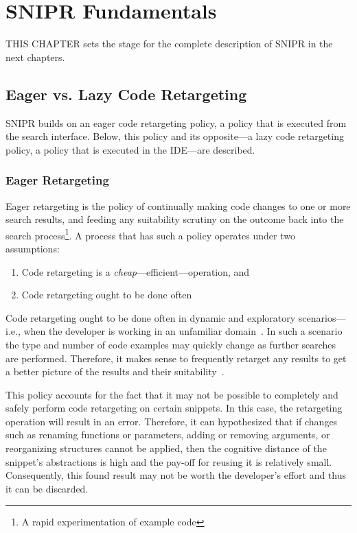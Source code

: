 \chapter{\uppercase{SnipR} Fundamentals}{}
\label{sec:fundamentals}


\lettrine[lraise=0.1, nindent=0em, slope=-.5em]{T} {HIS CHAPTER} sets the stage for the complete description of \uppercase{SnipR} in the next chapters.

\section{Eager vs. Lazy Code Retargeting}
\label{sec:eagervslazy}

\uppercase{SnipR} builds on an eager code retargeting policy, a policy that is executed from the search interface. Below, this policy and its opposite---a lazy code retargeting policy, a policy that is executed in the IDE---are described.

\subsection{Eager Retargeting}

Eager retargeting is the policy of continually making code changes to one or more search results, and feeding any suitability scrutiny on the outcome back into the search process\footnote{A rapid experimentation of example code}. A process that has such a policy operates under two assumptions:

\begin{enumerate}
	\item Code retargeting is a \emph{cheap}---efficient---operation, and
	\item Code retargeting ought to be done often
\end{enumerate}

Code retargeting ought to be done often in dynamic and exploratory scenarios---i.e., when the developer is working in an unfamiliar domain~\cite{Brandt:2009ew}. In such a scenario the type and number of code examples may quickly change as further searches are performed. Therefore, it makes sense to frequently retarget any results to get a better picture of the results and their suitability~\cite{Fowler:1999vp, Brandt:2009ew}. 

This policy accounts for the fact that it may not be possible to completely and safely perform code retargeting on certain snippets. In this case, the retargeting operation will result in an error. Therefore, it can hypothesized that if changes such as renaming functions or parameters, adding or removing arguments, or reorganizing structures cannot be applied, then the cognitive distance of the snippet's abstractions is high and the pay-off for reusing it is relatively small. Consequently, this found result may not be worth the developer's effort and thus it can be discarded.    

